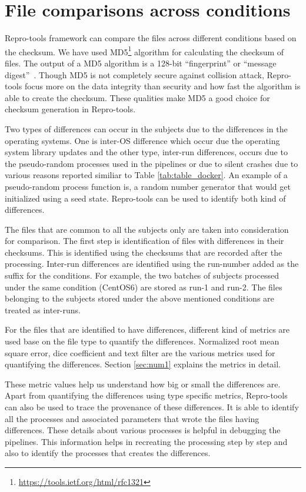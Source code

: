 \section{File comparisons across conditions}\label{file_analysis}
Repro-tools framework can compare the files across different conditions based on the checksum. We have used MD5\footnote{\url{https://tools.ietf.org/html/rfc1321}} algorithm for calculating the checksum of files. The output of a MD5 algorithm is a 128-bit ``fingerprint'' or ``message digest''~\cite{md5}. Though MD5 is not completely secure against collision attack, Repro-tools focus more on the data integrity than security and how fast the algorithm is able to create the checksum. These qualities make MD5 a good choice for checksum generation in Repro-tools.

Two types of differences can occur in the subjects due to the differences in the operating systems. One is inter-OS difference which occur due the operating system library updates and the other type, inter-run differences, occurs due to the pseudo-random processes used in the pipelines or due to silent crashes due to various reasons reported similiar to Table \ref{tab:table_docker}. An example of a pseudo-random process function is, a random number generator that would get initialized using a seed state. Repro-tools can be used to identify both kind of differences.

The files that are common to all the subjects only are taken into consideration for comparison. The first step is identification of files with differences in their checksums. This is identified using the checksums that are recorded after the processing. Inter-run differences are identified using the run-number added as the suffix for the conditions. For example, the two batches of subjects processed under the same condition (CentOS6) are stored as run-1 and run-2. The files belonging to the subjects stored under the above mentioned conditions are treated as inter-runs.

For the files that are identified to have differences, different kind of metrics are used base on the file type to quantify the differences. Normalized root mean square error, dice coefficient and text filter are the various metrics used for quantifying the differences. Section \ref{sec:num1} explains the metrics in detail. 

These metric values help us understand how big or small the differences are. Apart from quantifying the differences using type specific metrics, Repro-tools can also be used to trace the provenance of these differences. It is able to identify all the processes and associated parameters that wrote the files having differences. These details about various processes is helpful in debugging the pipelines. This information helps in recreating the processing step by step and also to identify the processes that creates the differences.

